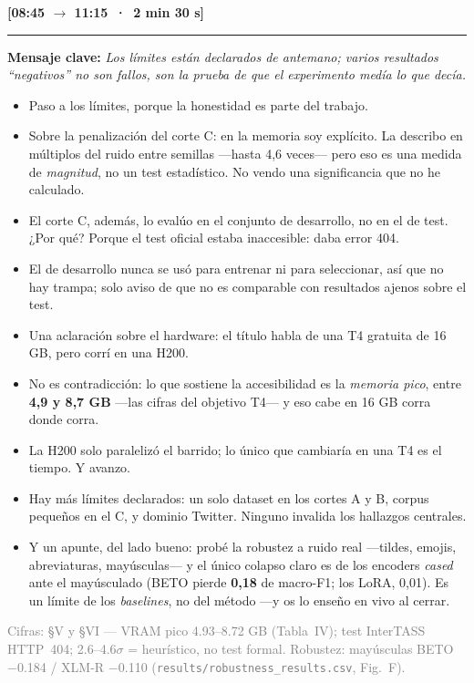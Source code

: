 \documentclass[11pt,a4paper]{article}
\newcommand{\bloque}[2]{\medskip\noindent{\large\textbf{\textcolor{blue!45!black}{#1}}}\hfill{\small\textbf{[#2]}}\par
  \nopagebreak\rule{\linewidth}{0.4pt}\par\nopagebreak\smallskip}
\newcommand{\clave}[1]{\noindent\textbf{Mensaje clave:} \emph{#1}\par\smallskip}
\newcommand{\visual}[1]{\noindent{\footnotesize\textcolor{teal!60!black}{$\square$~[apoyo visual]: #1}}\par\smallskip}
\newcommand{\fuente}[1]{\par{\footnotesize\textcolor{gray}{Cifras: #1}}\par}
\newcommand{\preempt}[1]{\par\smallskip\noindent{\footnotesize\textcolor{red!55!black}{\textbf{$\triangleright$ Pre-empción #1}}}\par}
\newenvironment{decir}{\begin{itemize}[label=\textbf{--},leftmargin=1.3em,itemsep=2.5pt,topsep=3pt]}{\end{itemize}}
\begin{document}
\bloque{4. Límites honestos}{08:45 $\rightarrow$ 11:15 \,·\, 2 min 30 s}
\clave{Los límites están declarados de antemano; varios resultados ``negativos'' no son fallos, son la prueba de que el experimento medía lo que decía.}
\visual{Lista breve: dev-split · sin test formal · H200 vs T4 · un solo dataset.}
\begin{decir}
  \item Paso a los límites, porque la honestidad es parte del trabajo.
  \item Sobre la penalización del corte C: en la memoria soy explícito. La describo en múltiplos del ruido entre semillas ---hasta 4,6 veces--- pero eso es una medida de \emph{magnitud}, no un test estadístico. No vendo una significancia que no he calculado.
  \item El corte C, además, lo evalúo en el conjunto de desarrollo, no en el de test. ¿Por qué? Porque el test oficial estaba inaccesible: daba error 404.
  \item El de desarrollo nunca se usó para entrenar ni para seleccionar, así que no hay trampa; solo aviso de que no es comparable con resultados ajenos sobre el test.
\end{decir}
\preempt{W4 --- H200 vs T4 (una frase y avanzar)}
\begin{decir}
  \item Una aclaración sobre el hardware: el título habla de una T4 gratuita de 16 GB, pero corrí en una H200.
  \item No es contradicción: lo que sostiene la accesibilidad es la \emph{memoria pico}, entre \textbf{4,9 y 8,7 GB} ---las cifras del objetivo T4--- y eso cabe en 16 GB corra donde corra.
  \item La H200 solo paraleliz\'o el barrido; lo único que cambiaría en una T4 es el tiempo. Y avanzo.
\end{decir}
\begin{decir}
  \item Hay más límites declarados: un solo dataset en los cortes A y B, corpus pequeños en el C, y dominio Twitter. Ninguno invalida los hallazgos centrales.
  \item Y un apunte, del lado bueno: probé la robustez a ruido real ---tildes, emojis, abreviaturas, mayúsculas--- y el único colapso claro es de los encoders \emph{cased} ante el mayúsculado (BETO pierde \textbf{0,18} de macro-F1; los LoRA, 0,01). Es un límite de los \emph{baselines}, no del método ---y os lo enseño en vivo al cerrar.
\end{decir}
\fuente{§V y §VI --- VRAM pico 4.93--8.72 GB (Tabla~IV); test InterTASS HTTP~404; 2.6--4.6$\sigma$ = heurístico, no test formal. Robustez: mayúsculas BETO $-$0.184 / XLM-R $-$0.110 (\texttt{results/robustness\_results.csv}, Fig.~F).}
\end{document}
